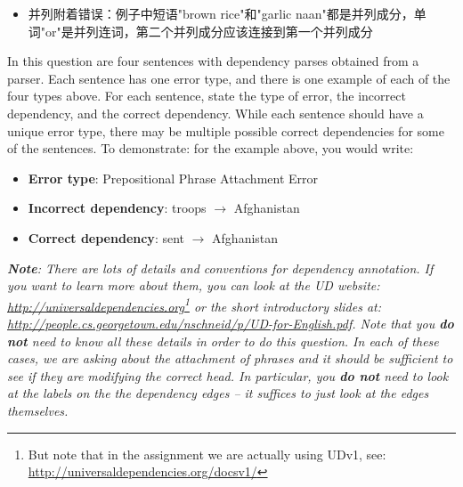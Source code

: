 \begin{parts}
\begin{itemize}
    \item 并列附着错误：例子中短语"brown rice"和"garlic naan"都是并列成分，单词"or"是并列连词，第二个并列成分应该连接到第一个并列成分
\end{itemize}
In this question are four sentences with dependency parses obtained from a parser. Each sentence has one error type, and there is one example of each of the four types above. 
For each sentence, state the type of error, the incorrect dependency, and the correct dependency. While each sentence should have a unique error type, there may be multiple possible correct dependencies for some of the sentences.
To demonstrate: for the example above, you would write: 
\begin{itemize}
    \item \textbf{Error type}: Prepositional Phrase Attachment Error 
    \item \textbf{Incorrect dependency}: troops $\rightarrow$ Afghanistan 
    \item \textbf{Correct dependency}: sent $\rightarrow$ Afghanistan
\end{itemize}

\textit{\textbf{Note}: 
There are lots of details and conventions for dependency annotation. 
If you want to learn more about them, you can look at the UD website: \url{http://universaldependencies.org}\footnote{But note that in the assignment we are actually using UDv1, see: \url{http://universaldependencies.org/docsv1/}} or the short introductory slides at: \url{http://people.cs.georgetown.edu/nschneid/p/UD-for-English.pdf}.
Note that you \textbf{do not} need to know all these details in order to do this question. In each of these cases, we are asking about the attachment of phrases and it should be sufficient to see if they are modifying the correct head.
In particular, you \textbf{do not} need to look at the labels on the the dependency edges -- it suffices to just look at the edges themselves. }

\medskip




\end{parts}
